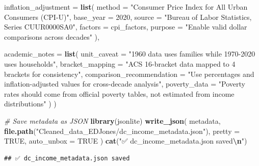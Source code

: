 \documentclass[
]{article}
\newenvironment{Shaded}{\begin{snugshade}}{\end{snugshade}}
\newcommand{\AttributeTok}[1]{\textcolor[rgb]{0.13,0.29,0.53}{#1}}
\newcommand{\CommentTok}[1]{\textcolor[rgb]{0.56,0.35,0.01}{\textit{#1}}}
\newcommand{\ConstantTok}[1]{\textcolor[rgb]{0.56,0.35,0.01}{#1}}
\newcommand{\DecValTok}[1]{\textcolor[rgb]{0.00,0.00,0.81}{#1}}
\newcommand{\FunctionTok}[1]{\textcolor[rgb]{0.13,0.29,0.53}{\textbf{#1}}}
\newcommand{\NormalTok}[1]{#1}
\newcommand{\SpecialCharTok}[1]{\textcolor[rgb]{0.81,0.36,0.00}{\textbf{#1}}}
\newcommand{\StringTok}[1]{\textcolor[rgb]{0.31,0.60,0.02}{#1}}
\begin{document}
\begin{Shaded}
\begin{Highlighting}[]
  \AttributeTok{inflation\_adjustment =} \FunctionTok{list}\NormalTok{(}
    \AttributeTok{method =} \StringTok{"Consumer Price Index for All Urban Consumers (CPI{-}U)"}\NormalTok{,}
    \AttributeTok{base\_year =} \DecValTok{2020}\NormalTok{,}
    \AttributeTok{source =} \StringTok{"Bureau of Labor Statistics, Series CUUR0000SA0"}\NormalTok{,}
    \AttributeTok{factors =}\NormalTok{ cpi\_factors,}
    \AttributeTok{purpose =} \StringTok{"Enable valid dollar comparisons across decades"}
\NormalTok{  ),}
  
  \AttributeTok{academic\_notes =} \FunctionTok{list}\NormalTok{(}
    \AttributeTok{unit\_caveat =} \StringTok{"1960 data uses families while 1970{-}2020 uses households"}\NormalTok{,}
    \AttributeTok{bracket\_mapping =} \StringTok{"ACS 16{-}bracket data mapped to 4 brackets for consistency"}\NormalTok{,}
    \AttributeTok{comparison\_recommendation =} \StringTok{"Use percentages and inflation{-}adjusted values for cross{-}decade analysis"}\NormalTok{,}
    \AttributeTok{poverty\_data =} \StringTok{"Poverty rates should come from official poverty tables, not estimated from income distributions"}
\NormalTok{  )}
\NormalTok{)}

\CommentTok{\# Save metadata as JSON}
\FunctionTok{library}\NormalTok{(jsonlite)}
\FunctionTok{write\_json}\NormalTok{(}
\NormalTok{  metadata,}
  \FunctionTok{file.path}\NormalTok{(}\StringTok{"Cleaned\_data\_EDJones/dc\_income\_metadata.json"}\NormalTok{),}
  \AttributeTok{pretty =} \ConstantTok{TRUE}\NormalTok{,}
  \AttributeTok{auto\_unbox =} \ConstantTok{TRUE}
\NormalTok{)}
\FunctionTok{cat}\NormalTok{(}\StringTok{"✅ dc\_income\_metadata.json saved}\SpecialCharTok{\textbackslash{}n}\StringTok{"}\NormalTok{)}
\end{Highlighting}
\end{Shaded}

\begin{verbatim}
## ✅ dc_income_metadata.json saved
\end{verbatim}
\end{document}
